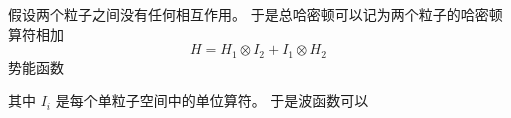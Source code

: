 
\begin{issues}
\issueDraft
\end{issues}


假设两个粒子之间没有任何相互作用。 于是总哈密顿可以记为两个粒子的哈密顿算符相加
\begin{equation}
H = H_1 \otimes I_2 + I_1 \otimes H_2~
\end{equation}
势能函数

其中 $I_i$ 是每个单粒子空间中的单位算符。 于是波函数可以



